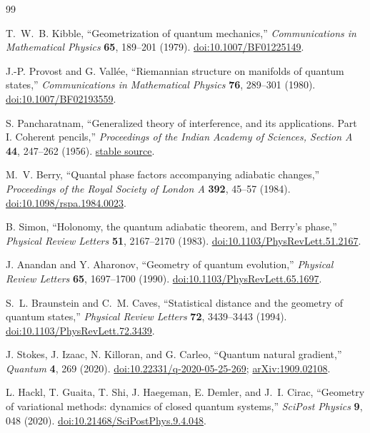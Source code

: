 \documentclass[10pt,twocolumn]{article}
\theoremstyle{definition}
\theoremstyle{remark}
\begin{document}
{\small
\begin{thebibliography}{99}

T.~W.~B. Kibble,
“Geometrization of quantum mechanics,”
\emph{Communications in Mathematical Physics} \textbf{65}, 189--201 (1979).
\href{https://doi.org/10.1007/BF01225149}{doi:10.1007/BF01225149}.

J.-P. Provost and G. Vall\'ee,
“Riemannian structure on manifolds of quantum states,”
\emph{Communications in Mathematical Physics} \textbf{76}, 289--301 (1980).
\href{https://doi.org/10.1007/BF02193559}{doi:10.1007/BF02193559}.

S. Pancharatnam,
“Generalized theory of interference, and its applications. Part I. Coherent pencils,”
\emph{Proceedings of the Indian Academy of Sciences, Section A} \textbf{44}, 247--262 (1956).
\href{https://www.ias.ac.in/article/fulltext/seca/044/05/0247-0262}{stable source}.

M.~V. Berry,
“Quantal phase factors accompanying adiabatic changes,”
\emph{Proceedings of the Royal Society of London A} \textbf{392}, 45--57 (1984).
\href{https://doi.org/10.1098/rspa.1984.0023}{doi:10.1098/rspa.1984.0023}.

B. Simon,
“Holonomy, the quantum adiabatic theorem, and Berry's phase,”
\emph{Physical Review Letters} \textbf{51}, 2167--2170 (1983).
\href{https://doi.org/10.1103/PhysRevLett.51.2167}{doi:10.1103/PhysRevLett.51.2167}.

J. Anandan and Y. Aharonov,
“Geometry of quantum evolution,”
\emph{Physical Review Letters} \textbf{65}, 1697--1700 (1990).
\href{https://doi.org/10.1103/PhysRevLett.65.1697}{doi:10.1103/PhysRevLett.65.1697}.

S.~L. Braunstein and C.~M. Caves,
“Statistical distance and the geometry of quantum states,”
\emph{Physical Review Letters} \textbf{72}, 3439--3443 (1994).
\href{https://doi.org/10.1103/PhysRevLett.72.3439}{doi:10.1103/PhysRevLett.72.3439}.

J. Stokes, J. Izaac, N. Killoran, and G. Carleo,
“Quantum natural gradient,”
\emph{Quantum} \textbf{4}, 269 (2020).
\href{https://doi.org/10.22331/q-2020-05-25-269}{doi:10.22331/q-2020-05-25-269};
\href{https://arxiv.org/abs/1909.02108}{arXiv:1909.02108}.

L. Hackl, T. Guaita, T. Shi, J. Haegeman, E. Demler, and J.~I. Cirac,
“Geometry of variational methods: dynamics of closed quantum systems,”
\emph{SciPost Physics} \textbf{9}, 048 (2020).
\href{https://doi.org/10.21468/SciPostPhys.9.4.048}{doi:10.21468/SciPostPhys.9.4.048}.


\end{thebibliography}}
\end{document}
